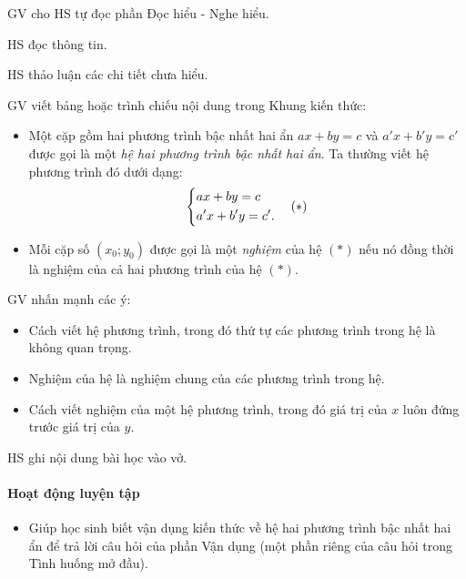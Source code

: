 \begin{tcth}
    \buocmot
    \item GV cho HS tự đọc phần Đọc hiểu - Nghe hiểu.
    \buochai
    \item HS đọc thông tin.
    \buocba
    \item HS thảo luận các chi tiết chưa hiểu.
    \buocbon
    \item GV viết bảng hoặc trình chiếu nội dung trong Khung kiến thức:
    \begin{kttt}
        \begin{itemize}
            \item Một cặp gồm hai phương trình bậc nhất hai ẩn $ax + by = c$ và $a'x + b'y = c'$ được gọi là một \textit{hệ hai phương trình bậc nhất hai ẩn}. Ta thường viết hệ phương trình đó dưới dạng:
            $$\left\{\begin{aligned}&ax + by = c\\&a'x + b'y = c'.\end{aligned}\right.\quad (*)$$
            \item Mỗi cặp số $(x_0; y_0)$ được gọi là một \textit{nghiệm} của hệ $(*)$ nếu nó đồng thời là nghiệm của cả hai phương trình của hệ $(*)$.
        \end{itemize}
    \end{kttt}
    \item GV nhấn mạnh các ý: 
    \begin{itemize}
        \item Cách viết hệ phương trình, trong đó thứ tự các phương trình trong hệ là không quan trọng. 
        \item Nghiệm của hệ là nghiệm chung của các phương trình trong hệ. 
        \item Cách viết nghiệm của một hệ phương trình, trong đó giá trị của $x$ luôn đứng trước giá trị của $y$. 
    \end{itemize}
    \item HS ghi nội dung bài học vào vở. 
\end{tcth}

\paragraph{Hoạt động luyện tập}

\muctieu

\begin{itemize}
    \item Giúp học sinh biết vận dụng kiến thức về hệ hai phương trình bậc nhất hai ẩn để
    trả lời câu hỏi của phần Vận dụng (một phần riêng của câu hỏi trong Tình huống mở đầu). 
\end{itemize}

